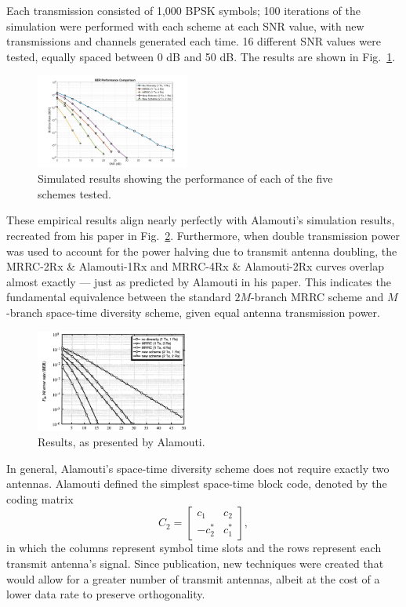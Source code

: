 \documentclass[journal]{IEEEtran}
\begin{document}
Each transmission consisted of 1,000 BPSK symbols; 100 iterations of the simulation were performed with each scheme at each SNR value, with new transmissions and channels generated each time. 16 different SNR values were tested, equally spaced between 0 dB and 50 dB. The results are shown in Fig.~\ref{fig:BER_mine}.
\begin{figure}
    \centering
    \includegraphics[width = 0.45\textwidth]{BER}
    \caption{Simulated results showing the performance of each of the five schemes tested.}
    \label{fig:BER_mine}
\end{figure}

These empirical results align nearly perfectly with Alamouti's simulation results, recreated from his paper in Fig.~\ref{fig:BER_alamouti}. Furthermore, when double transmission power was used to account for the power halving due to transmit antenna doubling, the MRRC-2Rx \& Alamouti-1Rx and MRRC-4Rx \& Alamouti-2Rx curves overlap almost exactly --- just as predicted by Alamouti in his paper. This indicates the fundamental equivalence between the standard $2M$-branch MRRC scheme and $M$-branch space-time diversity scheme, given equal antenna transmission power.
\begin{figure}
    \centering
    \includegraphics[width = 0.45\textwidth]{BER_alamouti}
    \caption{Results, as presented by Alamouti.}
    \label{fig:BER_alamouti}
\end{figure}

In general, Alamouti's space-time diversity scheme does not require exactly two antennas. Alamouti defined the simplest space-time block code, denoted by the coding matrix
\begin{equation}
C_2 = \begin{bmatrix}
c_1 & c_2 \\
-c_2^* & c_1^*
\end{bmatrix},
\end{equation}
in which the columns represent symbol time slots and the rows represent each transmit antenna's signal. Since publication, new techniques were created that would allow for a greater number of transmit antennas, albeit at the cost of a lower data rate to preserve orthogonality.



\end{document}

